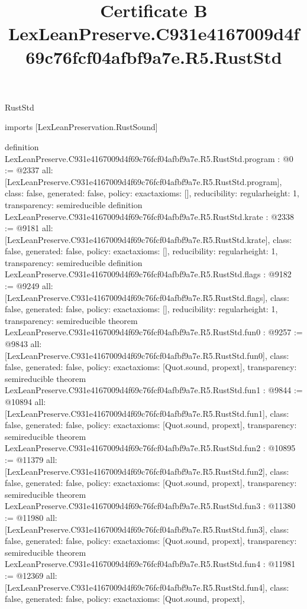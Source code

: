 \begin{lexlean}{RustStd}
\title{Certificate B LexLeanPreserve.C931e4167009d4f69c76fcf04afbf9a7e.R5.RustStd}
\begin{coremodule}
imports [LexLeanPreservation.RustSound]

definition LexLeanPreserve.C931e4167009d4f69c76fcf04afbf9a7e.R5.RustStd.program : @0 := @2337 {
  all: [LexLeanPreserve.C931e4167009d4f69c76fcf04afbf9a7e.R5.RustStd.program],
  class: false,
  generated: false,
  policy: exact{axioms: []},
  reducibility: regular{height: 1},
  transparency: semireducible
}
definition LexLeanPreserve.C931e4167009d4f69c76fcf04afbf9a7e.R5.RustStd.krate : @2338 := @9181 {
  all: [LexLeanPreserve.C931e4167009d4f69c76fcf04afbf9a7e.R5.RustStd.krate],
  class: false,
  generated: false,
  policy: exact{axioms: []},
  reducibility: regular{height: 1},
  transparency: semireducible
}
definition LexLeanPreserve.C931e4167009d4f69c76fcf04afbf9a7e.R5.RustStd.flags : @9182 := @9249 {
  all: [LexLeanPreserve.C931e4167009d4f69c76fcf04afbf9a7e.R5.RustStd.flags],
  class: false,
  generated: false,
  policy: exact{axioms: []},
  reducibility: regular{height: 1},
  transparency: semireducible
}
theorem LexLeanPreserve.C931e4167009d4f69c76fcf04afbf9a7e.R5.RustStd.fun0 : @9257 := @9843 {
  all: [LexLeanPreserve.C931e4167009d4f69c76fcf04afbf9a7e.R5.RustStd.fun0],
  class: false,
  generated: false,
  policy: exact{axioms: [Quot.sound, propext]},
  transparency: semireducible
}
theorem LexLeanPreserve.C931e4167009d4f69c76fcf04afbf9a7e.R5.RustStd.fun1 : @9844 := @10894 {
  all: [LexLeanPreserve.C931e4167009d4f69c76fcf04afbf9a7e.R5.RustStd.fun1],
  class: false,
  generated: false,
  policy: exact{axioms: [Quot.sound, propext]},
  transparency: semireducible
}
theorem LexLeanPreserve.C931e4167009d4f69c76fcf04afbf9a7e.R5.RustStd.fun2 : @10895 := @11379 {
  all: [LexLeanPreserve.C931e4167009d4f69c76fcf04afbf9a7e.R5.RustStd.fun2],
  class: false,
  generated: false,
  policy: exact{axioms: [Quot.sound, propext]},
  transparency: semireducible
}
theorem LexLeanPreserve.C931e4167009d4f69c76fcf04afbf9a7e.R5.RustStd.fun3 : @11380 := @11980 {
  all: [LexLeanPreserve.C931e4167009d4f69c76fcf04afbf9a7e.R5.RustStd.fun3],
  class: false,
  generated: false,
  policy: exact{axioms: [Quot.sound, propext]},
  transparency: semireducible
}
theorem LexLeanPreserve.C931e4167009d4f69c76fcf04afbf9a7e.R5.RustStd.fun4 : @11981 := @12369 {
  all: [LexLeanPreserve.C931e4167009d4f69c76fcf04afbf9a7e.R5.RustStd.fun4],
  class: false,
  generated: false,
  policy: exact{axioms: [Quot.sound, propext]},
}
\end{coremodule}
\end{lexlean}
